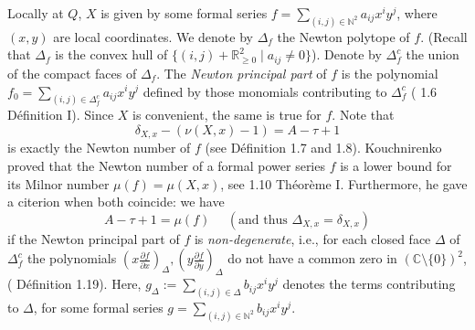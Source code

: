 \documentclass[oneside]{amsart}
\newcommand{\RR}{\mathbb{R}}
\newcommand{\CC}{\mathbb{C}}
\newcommand{\NN}{\mathbb{N}}
\theoremstyle{definition}
\begin{document}
Locally at $ Q $, $ X $ is given by some formal series $ f = \sum\limits_{(i,j) \in \NN^2} a_{ij} x^i y^j $, where $ (x,y) $ are local coordinates.
We denote by $ \Delta_f $ the Newton polytope of $ f $. 
(Recall that $ \Delta_f $ is the convex hull of $ \{ (i,j) + \RR^2_{\geq 0} \mid a_{ij} \neq 0   \} $).
Denote by $ \Delta_f^c $ the union of the compact faces of $ \Delta_f $. 
The {\em Newton principal part} of $ f $ is the polynomial 
$ f_0 = \sum\limits_{(i,j) \in \Delta_f^c} a_{ij} x^i y^j $
defined by those monomials contributing to $ \Delta_f^c $
(\cite{Kouchnirenko} 1.6 D\'efinition I).
Since $ X $ is convenient, the same is true for $ f $.
Note that 
$$ 
	\delta_{X,x} - (\nu(X,x) - 1) = A - \tau + 1 
$$ 
is exactly the Newton number of $ f $
(see \cite{Kouchnirenko} D\'efinition 1.7 and 1.8).
Kouchnirenko proved that the Newton number of a formal power series $ f $ 
is a lower bound for its Milnor number $ \mu (f) = \mu (X,x) $,
see \cite{Kouchnirenko} 1.10 Th\'eor{\`e}me I.
Furthermore, he gave a citerion when both coincide:
we have
$$
	 A - \tau + 1 = \mu (f)
	 \ \ \ \ \ \ 
	 (\mbox{and thus }
	 \Delta_{X,x} = \delta_{X,x})
$$
if the Newton principal part of $ f $ is {\em non-degenerate}, 
i.e.,
for each closed face $ \Delta $ of $ \Delta^c_f $ the polynomials 
$ (x \frac{\partial f}{\partial x})_\Delta, (y \frac{\partial f}{\partial y})_\Delta $ 
do not have a common zero in $ ( \CC \setminus \{ 0 \} )^2 $,
(\cite{Kouchnirenko} D\'efinition 1.19).
Here, $ g_\Delta := \sum_{(i,j) \in \Delta} b_{ij} x^i y^j $ denotes the terms 
contributing to $ \Delta $, for some formal series 
$ g = \sum_{(i,j) \in \NN^2} b_{ij} x^i y^j $. 
\end{document}
